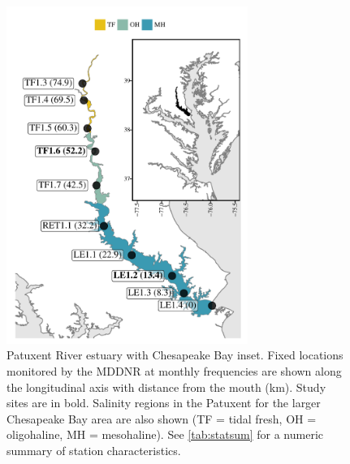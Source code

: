 \documentclass{svjour3}\usepackage[]{graphicx}\usepackage[]{color}
\begin{document}
\begin{figure}[!ht]

{\centering \includegraphics[width=0.7\textwidth]{figs/map-1} 

}

\caption{Patuxent River estuary with Chesapeake Bay inset. Fixed locations monitored by the \acl{MDDNR} at monthly frequencies are shown along the longitudinal axis with distance from the mouth (km).  Study sites are in bold. Salinity regions in the Patuxent for the larger Chesapeake Bay area are also shown (TF = tidal fresh, OH = oligohaline, MH = mesohaline). See \cref{tab:statsum} for a numeric summary of station characteristics.}\label{fig:map}
\end{figure}
\end{document}
